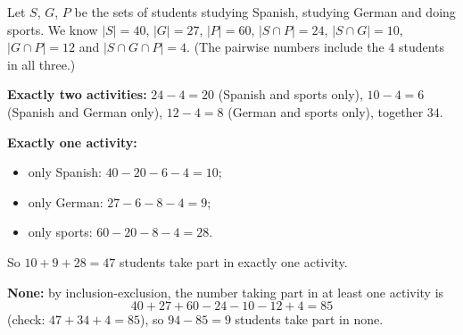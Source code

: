 Let $S$, $G$, $P$ be the sets of students studying Spanish, studying German and doing sports. We know $|S|=40$, $|G|=27$, $|P|=60$, $|S\cap P|=24$, $|S\cap G|=10$, $|G\cap P|=12$ and $|S\cap G\cap P|=4$. (The pairwise numbers include the $4$ students in all three.)

\textbf{Exactly two activities:} $24-4=20$ (Spanish and sports only), $10-4=6$ (Spanish and German only), $12-4=8$ (German and sports only), together $34$.

\textbf{Exactly one activity:}
\begin{itemize}
\item only Spanish: $40-20-6-4=10$;
\item only German: $27-6-8-4=9$;
\item only sports: $60-20-8-4=28$.
\end{itemize}
So $10+9+28=\boxed{47}$ students take part in exactly one activity.

\textbf{None:} by inclusion-exclusion, the number taking part in at least one activity is
\[40+27+60-24-10-12+4=85\]
(check: $47+34+4=85$), so $94-85=\boxed{9}$ students take part in none.
